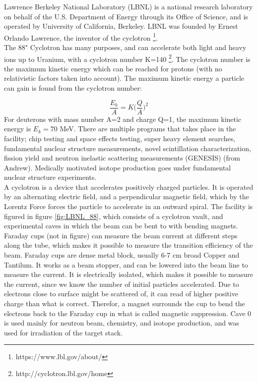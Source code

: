 \documentclass[a4paper,11pt,twoside]{book}
\begin{document}
Lawrence Berkeley National Laboratory (LBNL) is a national research laboratory on behalf of the U.S. Department of Energy through its Office of Science, and is operated by University of California, Berkeley. LBNL was founded by Ernest Orlando Lawrence, the inventor of the cyclotron \footnote{https://www.lbl.gov/about/}. \\ 


\noindent
The 88" Cyclotron has many purposes, and can accelerate both light and heavy ions up to Uranium, with a cyclotron number K=140  \footnote{http://cyclotron.lbl.gov/home}. The cyclotron number is the maximum kinetic energy which can be reached for protons (with no relativistic factors taken into account). The maximum kinetic energy a particle can gain is found from the cyclotron number:

\begin{equation}
    \frac{E_k}{A}=K\Big(\frac{Q}{A}\Big)^2
\end{equation}
\noindent 
For deuterons with mass number A=2 and charge Q=1, the maximum kinetic energy is $E_k=70$ MeV. There are multiple programs that takes place in the facility; chip testing and space effects testing, super heavy element searches, fundamental nuclear structure measurements, novel scintillation characterization, fission yield and neutron inelastic scattering measurements (GENESIS) (from Andrew). Medically motivated isotope production goes under fundamental nuclear structure experiments. \\

\noindent 
A cyclotron is a device that accelerates positively charged particles. It is operated by an alternating electric field, and a perpendicular magnetic field, which by the Lorentz Force forces the particle to accelerate in an outward spiral. 
The facility is figured in figure \ref{fig:LBNL_88}, which consists of a cyclotron vault, and experimental caves in which the beam can be bent to with bending magnets. Faraday cups (not in figure) can measure the beam current at different steps along the tube, which makes it possible to measure the transition efficiency of the beam. Faraday cups are dense metal block, usually 6-7 cm broad Copper and Tantilum. It works as a beam stopper, and can be lowered into the beam line to measure the current. It is electrically isolated, which makes it possible to measure the current, since we know the number of initial particles accelerated. Due to electrons close to surface might be scattered of, it can read of higher positive charge than what is correct. Therefor, a magnet surrounds the cup to bend the electrons back to the Faraday cup in what is called magnetic suppression. Cave 0 is used mainly for neutron beam, chemistry, and isotope production, and was used for irradiation of the target stack.
\end{document}
